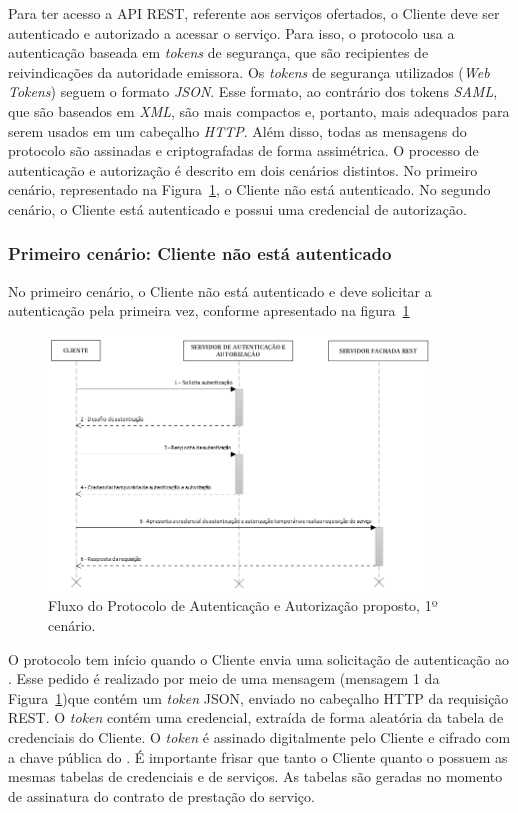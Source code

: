 Para ter acesso a API REST, referente aos serviços ofertados, o Cliente deve ser autenticado e autorizado a acessar o serviço. Para isso, o protocolo usa a autenticação baseada em \emph{tokens} de segurança, que são recipientes de reivindicações da autoridade emissora. Os \emph{tokens} de segurança utilizados (\emph{Web Tokens}) seguem o formato \emph{JSON}. Esse formato, ao contrário dos tokens \emph{SAML}, que são baseados em \emph{XML}, são mais compactos e, portanto, mais adequados para serem usados em um cabeçalho \emph{HTTP}. Além disso, todas as mensagens do protocolo são assinadas e criptografadas de forma assimétrica. O processo de autenticação e autorização é descrito em dois cenários distintos. No primeiro cenário, representado na Figura~\ref{fig:protocoloseguro}, o Cliente não está autenticado. No segundo cenário, o Cliente está autenticado e possui uma credencial de autorização. %

\subsubsection{Primeiro cenário: Cliente não está autenticado}

No primeiro cenário, o Cliente não está autenticado e deve solicitar a autenticação pela primeira vez, conforme apresentado na figura~\ref{fig:protocoloseguro}

\begin{figure}[!htb]
    \centering
    \includegraphics[width=0.9\textwidth]{fluxo_autenticacao1.png}
    \caption{Fluxo do Protocolo de Autenticação e Autorização proposto, 1º cenário.}
    \label{fig:protocoloseguro}
\end{figure}


O protocolo tem início quando o Cliente envia uma solicitação de autenticação ao \servidorAA.
Esse pedido é realizado por meio de uma mensagem (mensagem 1 da Figura~\ref{fig:protocoloseguro})que contém um \emph{token} JSON, enviado no cabeçalho HTTP da requisição REST. O \emph{token} contém uma credencial, extraída de forma aleatória da tabela de credenciais do Cliente. O \emph{token} é assinado digitalmente pelo Cliente e cifrado com a chave pública do \servidorAA. É importante frisar que tanto o Cliente quanto o \servidorAA{} possuem as mesmas tabelas de credenciais e de serviços. As tabelas são geradas no momento de assinatura do contrato de prestação do serviço.


